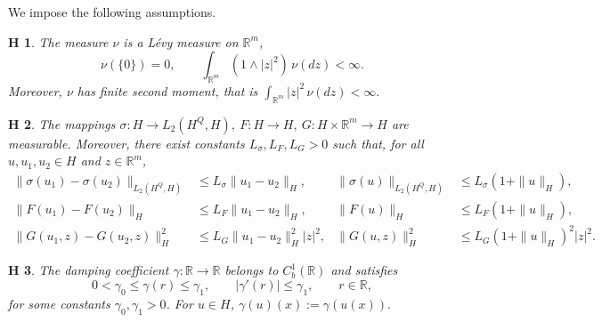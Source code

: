 \documentclass[11pt]{article}
\theoremstyle{plain}
\newtheorem{Assumption}{H\!\!} %
\numberwithin{equation}{section}
\begin{document}
We impose the following assumptions.

\begin{Assumption}\label{H1}
The measure \(\nu\) is a L\'evy measure on \(\mathbb R^m\), 
\[
\nu(\{0\})=0, \qquad \int_{\mathbb R^m}(1\wedge |z|^2)\,\nu(dz)<\infty .
\]
Moreover, \(\nu\) has finite second moment, that is \(\int_{\mathbb R^m}|z|^2\,\nu(dz)<\infty .\)
\end{Assumption}

\begin{Assumption}\label{H2}
The mappings \(\sigma:H\to L_2(H^Q,H),~F:H\to H,~G:H\times\mathbb R^m\to H\)
are measurable. Moreover, there exist constants \(L_\sigma,L_F,L_G>0\) such that, for all
\(u,u_1,u_2\in H\) and \(z\in\mathbb R^m\),
\begin{align*}
\|\sigma(u_1)-\sigma(u_2)\|_{L_2(H^Q,H)}&\le L_\sigma\|u_1-u_2\|_H,&\|\sigma(u)\|_{L_2(H^Q,H)}&\le L_\sigma(1+\|u\|_H),\\
\|F(u_1)-F(u_2)\|_H&\le L_F\|u_1-u_2\|_H,&\|F(u)\|_H&\le L_F(1+\|u\|_H),\\
\|G(u_1,z)-G(u_2,z)\|_H^2&\le L_G\|u_1-u_2\|_H^2|z|^2,&\|G(u,z)\|_H^2&\le L_G(1+\|u\|_H)^2|z|^2 .
\end{align*}
\end{Assumption}

\begin{Assumption}\label{H3}
The damping coefficient \(\gamma:\mathbb R\to\mathbb R\) belongs to
\(C_b^1(\mathbb R)\) and satisfies
\[
0<\gamma_0\le \gamma(r)\le \gamma_1,\qquad|\gamma'(r)|\le \gamma_1,\qquad r\in\mathbb R,
\]
for some constants \(\gamma_0,\gamma_1>0\). For \(u\in H\),   \(\gamma(u)(x):=\gamma(u(x)).\)
\end{Assumption}
\end{document}
